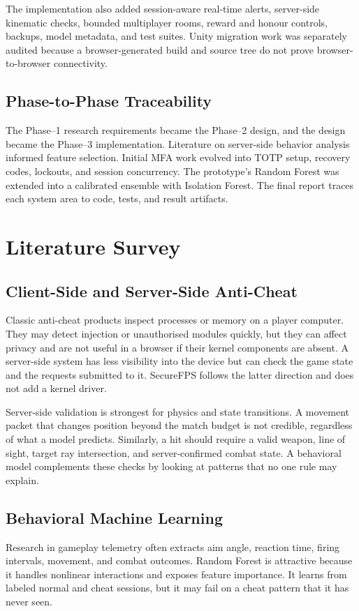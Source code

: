 \documentclass[12pt,a4paper,oneside]{report}
\begin{document}
The implementation also added session-aware real-time alerts, server-side kinematic checks, bounded multiplayer rooms, reward and honour controls, backups, model metadata, and test suites. Unity migration work was separately audited because a browser-generated build and source tree do not prove browser-to-browser connectivity.

\section{Phase-to-Phase Traceability}
The Phase--1 research requirements became the Phase--2 design, and the design became the Phase--3 implementation. Literature on server-side behavior analysis informed feature selection. Initial MFA work evolved into TOTP setup, recovery codes, lockouts, and session concurrency. The prototype's Random Forest was extended into a calibrated ensemble with Isolation Forest. The final report traces each system area to code, tests, and result artifacts.

\chapter{Literature Survey}
\section{Client-Side and Server-Side Anti-Cheat}
Classic anti-cheat products inspect processes or memory on a player computer. They may detect injection or unauthorised modules quickly, but they can affect privacy and are not useful in a browser if their kernel components are absent. A server-side system has less visibility into the device but can check the game state and the requests submitted to it. SecureFPS follows the latter direction and does not add a kernel driver.

Server-side validation is strongest for physics and state transitions. A movement packet that changes position beyond the match budget is not credible, regardless of what a model predicts. Similarly, a hit should require a valid weapon, line of sight, target ray intersection, and server-confirmed combat state. A behavioral model complements these checks by looking at patterns that no one rule may explain.

\section{Behavioral Machine Learning}
Research in gameplay telemetry often extracts aim angle, reaction time, firing intervals, movement, and combat outcomes. Random Forest is attractive because it handles nonlinear interactions and exposes feature importance. It learns from labeled normal and cheat sessions, but it may fail on a cheat pattern that it has never seen.
\end{document}
